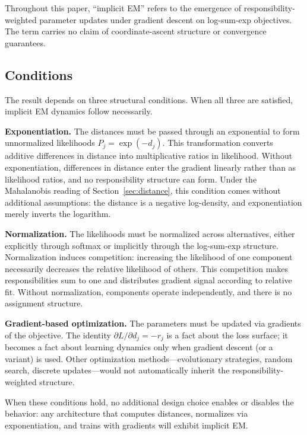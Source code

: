 Throughout this paper, ``implicit EM'' refers to the emergence of responsibility-weighted parameter updates under gradient descent on log-sum-exp objectives. The term carries no claim of coordinate-ascent structure or convergence guarantees.

\subsection{Conditions}
\label{sec:conditions}

The result depends on three structural conditions. When all three are satisfied, implicit EM dynamics follow necessarily.

\textbf{Exponentiation.} The distances must be passed through an exponential to form unnormalized likelihoods $P_j = \exp(-d_j)$. This transformation converts additive differences in distance into multiplicative ratios in likelihood. Without exponentiation, differences in distance enter the gradient linearly rather than as likelihood ratios, and no responsibility structure can form. Under the Mahalanobis reading of Section~\ref{sec:distance}, this condition comes without additional assumptions: the distance is a negative log-density, and exponentiation merely inverts the logarithm.

\textbf{Normalization.} The likelihoods must be normalized across alternatives, either explicitly through softmax or implicitly through the log-sum-exp structure. Normalization induces competition: increasing the likelihood of one component necessarily decreases the relative likelihood of others. This competition makes responsibilities sum to one and distributes gradient signal according to relative fit. Without normalization, components operate independently, and there is no assignment structure.

\textbf{Gradient-based optimization.} The parameters must be updated via gradients of the objective. The identity $\partial L / \partial d_j = -r_j$ is a fact about the loss surface; it becomes a fact about learning dynamics only when gradient descent (or a variant) is used. Other optimization methods---evolutionary strategies, random search, discrete updates---would not automatically inherit the responsibility-weighted structure.

When these conditions hold, no additional design choice enables or disables the behavior: any architecture that computes distances, normalizes via exponentiation, and trains with gradients will exhibit implicit EM.


